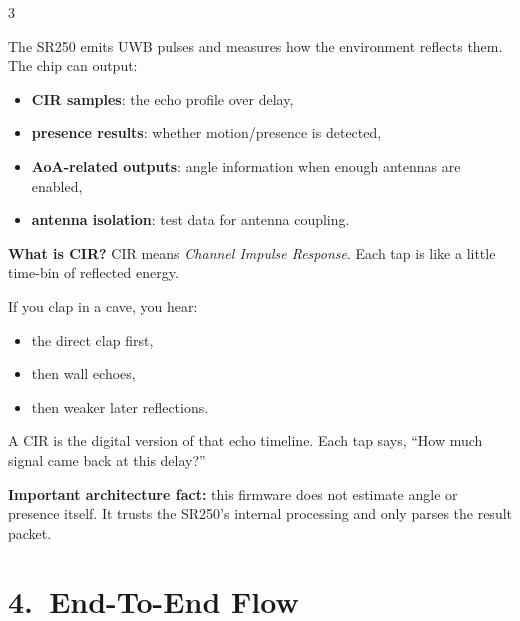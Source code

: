 \documentclass[10pt]{article}
\begin{document}
\begin{multicols*}{3}
\begin{tcolorbox}[intubox={What ``Radar'' Means in This Code}]
The SR250 emits UWB pulses and measures how the environment reflects them.
The chip can output:
\begin{itemize}
  \item \textbf{CIR samples}: the echo profile over delay,
  \item \textbf{presence results}: whether motion/presence is detected,
  \item \textbf{AoA-related outputs}: angle information when enough antennas are enabled,
  \item \textbf{antenna isolation}: test data for antenna coupling.
\end{itemize}
\end{tcolorbox}

\textbf{What is CIR?}
CIR means \emph{Channel Impulse Response}. Each tap is like a little time-bin of reflected energy.

\begin{tcolorbox}[analogybox={Analogy --- Clapping In A Cave}]
If you clap in a cave, you hear:
\begin{itemize}
  \item the direct clap first,
  \item then wall echoes,
  \item then weaker later reflections.
\end{itemize}
A CIR is the digital version of that echo timeline.
Each tap says, ``How much signal came back at this delay?''
\end{tcolorbox}

\textbf{Important architecture fact:} this firmware does not estimate angle or presence itself. It trusts the SR250's internal processing and only parses the result packet.

\section*{4.\ End-To-End Flow}



\end{multicols*}
\end{document}
